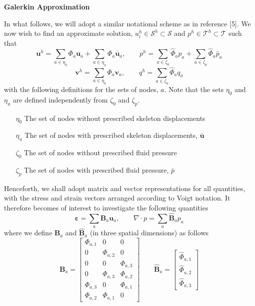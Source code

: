 \documentclass[11pt]{article} %
\begin{document}
\begin{center} \textbf{Galerkin Approximation} \end{center}
In what follows, we will adopt a similar notational scheme as in reference [5]. We now wish to find an approximate solution, $u^h_i \in \mathcal{S}^h \subset \mathcal{S}$ and $p^h \in \mathcal{T}^h \subset \mathcal{T}$ such that
\begin{equation}
	\mathbf{u}^h = \sum_{a \in \eta_0} \Phi_a \mathbf{u}_a + \sum_{a \in \eta_u} \Phi_a \bar{\mathbf{u}}_a, \qquad p^h = \sum_{a \in \zeta_0} \hat{\Phi}_a p_a + \sum_{a \in \zeta_p} \hat{\Phi}_a \bar{p}_a
\end{equation}
\begin{equation}
	\mathbf{v}^h = \sum_{a \in \eta_0} \Phi_a \mathbf{v}_a, \qquad q^h = \sum_{a \in \zeta_0} \hat{\Phi}_a q_a
\end{equation}
with the following definitions for the sets of nodes, $a$. Note that the sets $\eta_0$ and $\eta_u$ are defined independently from $\zeta_0$ and $\zeta_p$.
\begin{itemize}
	\item[$\eta_0$] The set of nodes without prescribed skeleton displacements
	\item[$\eta_u$] The set of nodes with prescribed skeleton displacements, $\bar{\mathbf{u}}$
	\item[$\zeta_0$] The set of nodes without prescribed fluid pressure
	\item[$\zeta_p$] The set of nodes with prescribed fluid pressure, $\bar{p}$
\end{itemize}
Henceforth, we shall adopt matrix and vector representations for all quantities, with the stress and strain vectors arranged according to Voigt notation. It therefore becomes of interest to investigate the following quantities
\begin{equation}
	\mathbf{\varepsilon} = \sum_{a} \mathbf{B}_a \mathbf{u}_a, \qquad \nabla \cdot p = \sum_{a} \hat{\mathbf{B}}_a p_a
\end{equation}
where we define $\mathbf{B}_a$ and $\hat{\mathbf{B}}_a$ (in three spatial dimensions) as follows
\begin{equation}
	\mathbf{B}_a = \left[
	\begin{array}{ccc}
		\Phi_{a,1} & 0 & 0 \\
		0 & \Phi_{a,2} & 0 \\
		0 & 0 & \Phi_{a,3} \\
		0 & \Phi_{a,3} & \Phi_{a,2} \\
		\Phi_{a,3} & 0 & \Phi_{a,1} \\
		\Phi_{a,2}& \Phi_{a,1} & 0 
	\end{array} \right]
	\qquad
	\hat{\mathbf{B}}_a = \left[
	\begin{array}{c}
		\hat{\Phi}_{a,1} \\
		\hat{\Phi}_{a,2} \\
		\hat{\Phi}_{a,3}
	\end{array} \right]
\end{equation}
\end{document}
